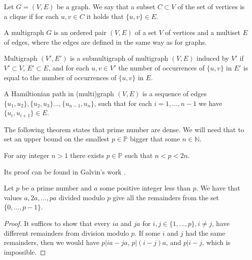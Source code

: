 \begin{defn}[clique]
Let $G=(V,E)$ be a graph.
We say that a subset $C \subset V$ of the set of vertices is a clique if
for each $u,v \in C$ it holds that $\{u,v\} \in E$.
\end{defn}

\begin{defn}[multigraph]
A multigraph $G$ is an ordered pair $(V,E)$ of a set $V$ of vertices and a multiset $E$ of edges,
where the edges are defined in the same way as for graphs.
\end{defn}

\begin{defn}
Multigraph $(V', E')$ is a submultigraph of multigraph $(V,E)$ induced by $V'$
if $V' \subset V$, $E' \subset E$, and for each $u,v \in V'$ 
the number of occurrences of $\{u,v\}$ in $E'$ is equal to the number of occurrences of $\{u,v\}$ in $E$.
\end{defn}

\begin{defn}
A Hamiltionian path in (multi)graph $(V,E)$
is a sequence of edges $\{u_1, u_2\}, \{u_2, u_3\} ..., \{u_{n-1}, u_n\}$,
such that for each $i=1,...,n-1$ we have $\{u_i, u_{i+1}\} \in E$.
\end{defn}


The following theorem states that prime number are dense.
We will need that to set an upper bound on the smallest $p \in \mathbb{P}$
bigger that some $n \in \mathbb{N}$.

\begin{thm} \label{bertrand-chebyshev}
For any integer $n>1$ there exists $p \in \mathbb{P}$ such that $n < p < 2n$.
\end{thm}

Its proof can be found in Galvin's work \cite{bertrand}.

\begin{thm} \label{zp}
Let $p$ be a prime number and $a$ some positive integer less than $p$.
We have that values $a, 2a, ..., pa$ divided modulo $p$ give all the remainders from the set $\{0, ..., p-1\}$.
\end{thm}

\begin{proof}
It suffices to show that every $ia$ and $ja$ for $i,j \in \{1, ..., p\}, i \neq j$,
have different remainders from division modulo $p$.
If some $i$ and $j$ had the same remainders,
then we would have $p | ia - ja$, $p | (i-j)a$, and $p | i-j$, which is impossible.
\end{proof}

